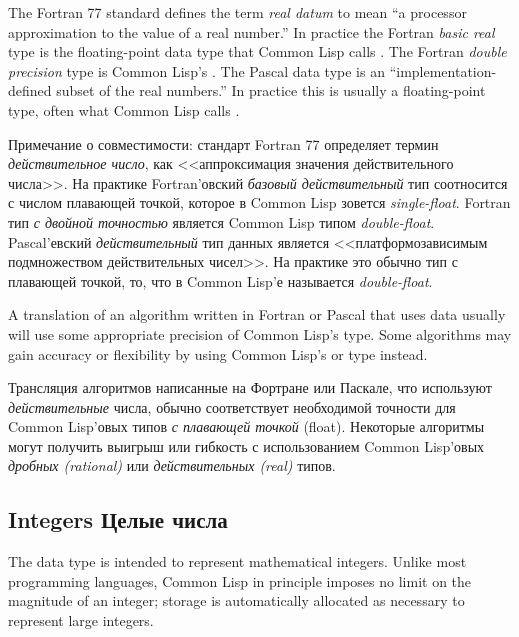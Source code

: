 \begin{newer}
\beforenoterule
\begin{incompatibility}
The Fortran 77 standard defines the term
             {\it real datum} to mean ``a processor approximation to the value
             of a real number.''  In practice the Fortran {\it basic real} type
             is the floating-point data type that Common Lisp calls
             .  The Fortran {\it double precision} type is
             Common Lisp's .  The Pascal  data type is
             an ``implementation-defined subset of the real numbers.''  In
             practice this is usually a floating-point type, often what
             Common Lisp calls .

Примечание о совместимости: стандарт Fortran 77 определяет термин
{\it действительное число}, как <<аппроксимация значения действительного
числа>>. На практике Fortran'овский {\it базовый действительный} тип
соотносится с числом плавающей точкой, которое в Common Lisp
зовется {\it single-float}. Fortran тип {\it с двойной точностью} является
Common Lisp типом {\it double-float}. Pascal'евский {\it действительный} тип
данных является <<платформозависимым подмножеством действительных
чисел>>. На практике это обычно тип с плавающей точкой, то, что в
Common Lisp'е называется {\it double-float}. 

             A translation of an algorithm written in Fortran or Pascal
             that uses  data usually will use some appropriate
             precision of Common Lisp's  type.  Some algorithms may
             gain accuracy or flexibility by using Common Lisp's
              or  type instead.

Трансляция алгоритмов написанные на Фортране или Паскале, что
используют {\it действительные} числа, обычно соответствует необходимой
точности для Common Lisp'овых типов {\it с плавающей точкой}
(float). Некоторые алгоритмы могут получить выигрыш или гибкость с
использованием Common Lisp'овых {\it дробных (rational)} или
{\it действительных (real)} типов. 
\end{incompatibility}
\afternoterule
\end{newer}

\subsection{Integers Целые числа}
\label{INTEGERS-SECTION}

The  data type is intended to represent mathematical integers.
Unlike most programming languages, Common Lisp in principle imposes no limit on
the magnitude of an integer; storage
is automatically allocated as necessary to represent large integers.

